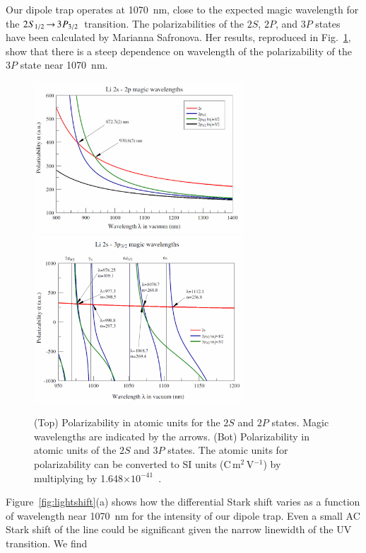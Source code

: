 \documentclass[oneside,12pt]{memoir}
\newcommand{\twos}[1]{\ensuremath{\hspace{-1pt}2\hspace{0.5pt}\hspace{0pt}S_{#1}\hspace{-1pt}}}
\newcommand{\trep}[1]{\ensuremath{\hspace{-1pt}3\hspace{0.5pt}\hspace{0pt}P_{#1}\hspace{-1pt}}}
\newcommand{\uv}{\ensuremath{ \twos{1/2}\hspace{-0.0pt}\rightarrow\hspace{-0.0pt}\trep{3/2} }\ }
\begin{document}
Our dipole trap operates at 1070~nm, close to the expected magic wavelength for
the \uv transition.  The polarizabilities of the $2S$, $2P$, and $3P$ states
have been calculated by Marianna Safronova. Her results, reproduced in
Fig.~\ref{fig:safronova}, show that there is a steep dependence on wavelength
of the polarizability of the $3P$ state near 1070~nm.  \begin{figure}
\centering \includegraphics[width=0.7\textwidth]{../figures/safronova/2s2p.pdf}
\includegraphics[width=0.7\textwidth]{../figures/safronova/2s3p.pdf}
\caption[Polarizabilities for 1070 nm light]{\small (Top) Polarizability in
atomic units for the $2S$ and $2P$ states. Magic wavelengths are indicated by
the arrows.   (Bot) Polarizability in atomic units of the $2S$ and $3P$ states.
The atomic units for polarizability can be converted to SI units
(C\,m$^{2}$\,V$^{-1}$) by multiplying by
1.648$\times10^{-41}$~\cite{Safronova2006,Safronova2010}.}
\label{fig:safronova} \end{figure} Figure~\ref{fig:lightshift}(a) shows how the
differential Stark shift  varies  as a function of wavelength near 1070~nm for
the intensity of our dipole trap.  Even a small AC Stark shift of the line
could be significant given the narrow linewidth of the UV transition.   We find
\end{document}
